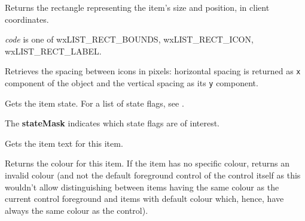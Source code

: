 \label{wxlistctrlgetitemrect}


Returns the rectangle representing the item's size and position, in client coordinates.

{\it code} is one of wxLIST\_RECT\_BOUNDS, wxLIST\_RECT\_ICON, wxLIST\_RECT\_LABEL.





\label{wxlistctrlgetitemspacing}


Retrieves the spacing between icons in pixels: horizontal spacing is returned
as \texttt{x} component of the  object and the vertical
spacing as its \texttt{y} component.



\label{wxlistctrlgetitemstate}


Gets the item state. For a list of state flags, see .

The {\bf stateMask} indicates which state flags are of interest.


\label{wxlistctrlgetitemtext}


Gets the item text for this item.


\label{wxlistctrlgetitemtextcolour}


Returns the colour for this item. If the item has no specific colour, returns
an invalid colour (and not the default foreground control of the control itself
as this wouldn't allow distinguishing between items having the same colour as
the current control foreground and items with default colour which, hence, have
always the same colour as the control).


